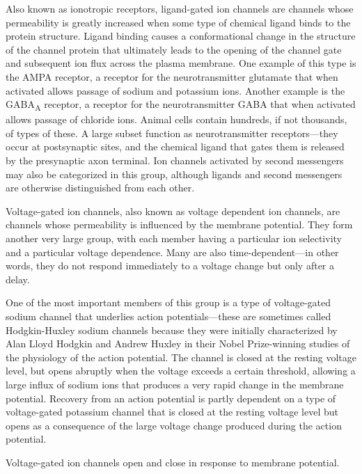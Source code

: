 \documentclass[]{book}
\begin{document}
Also known as ionotropic receptors, ligand-gated ion channels are channels whose permeability is greatly increased when some type of chemical ligand binds to the protein structure. Ligand binding causes a conformational change in the structure of the channel protein that ultimately leads to the opening of the channel gate and subsequent ion flux across the plasma membrane. One example of this type is the AMPA receptor, a receptor for the neurotransmitter glutamate that when activated allows passage of sodium and potassium ions. Another example is the GABA\textsubscript{A} receptor, a receptor for the neurotransmitter GABA that when activated allows passage of chloride ions. Animal cells contain hundreds, if not thousands, of types of these. A large subset function as neurotransmitter receptors---they occur at postsynaptic sites, and the chemical ligand that gates them is released by the presynaptic axon terminal. Ion channels activated by second messengers may also be categorized in this group, although ligands and second messengers are otherwise distinguished from each other.

Voltage-gated ion channels, also known as voltage dependent ion channels, are channels whose permeability is influenced by the membrane potential. They form another very large group, with each member having a particular ion selectivity and a particular voltage dependence. Many are also time-dependent---in other words, they do not respond immediately to a voltage change but only after a delay.

One of the most important members of this group is a type of voltage-gated sodium channel that underlies action potentials---these are sometimes called Hodgkin-Huxley sodium channels because they were initially characterized by Alan Lloyd Hodgkin and Andrew Huxley in their Nobel Prize-winning studies of the physiology of the action potential. The channel is closed at the resting voltage level, but opens abruptly when the voltage exceeds a certain threshold, allowing a large influx of sodium ions that produces a very rapid change in the membrane potential. Recovery from an action potential is partly dependent on a type of voltage-gated potassium channel that is closed at the resting voltage level but opens as a consequence of the large voltage change produced during the action potential.

Voltage-gated ion channels open and close in response to membrane potential.
\end{document}

